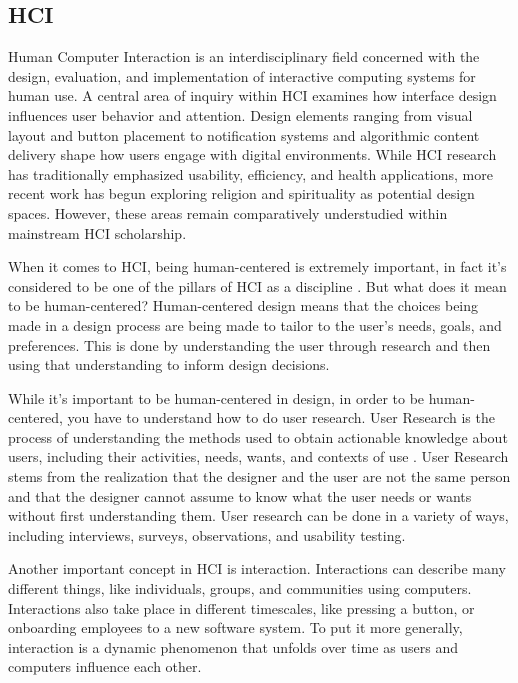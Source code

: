 \documentclass[12pt]{article}
\begin{document}
\subsection{HCI}
 Human Computer Interaction is an interdisciplinary field concerned with the design, evaluation, and implementation of interactive computing systems for human use. A central area of inquiry within HCI examines how interface design influences user behavior and attention\cite{10.1145/3538706}. Design elements ranging from visual layout and button placement to notification systems and algorithmic content delivery shape how users engage with digital environments. While HCI research has traditionally emphasized usability, efficiency, and health applications, more recent work has begun exploring religion and spirituality as potential design spaces. However, these areas remain comparatively understudied within mainstream HCI scholarship.

 When it comes to HCI, being human-centered is extremely important, in fact it's considered to be one of the pillars of HCI as a discipline \cite{Hornbæk_Kristensson_Oulasvirta_2025}. But what does it mean to be human-centered? Human-centered design means that the choices being made in a design process are being made to tailor to the user's needs, goals, and preferences. This is done by understanding the user through research and then using that understanding to inform design decisions. 

 While it's important to be human-centered in design, in order to be human-centered, you have to understand how to do user research. User Research is the process of understanding the methods used to obtain actionable knowledge about users, including their activities, needs, wants, and contexts of use \cite{Hornbæk_Kristensson_Oulasvirta_2025}.
 User Research stems from the realization that the designer and the user are not the same person and that the designer cannot assume to know what the user needs or wants without first understanding them. User research can be done in a variety of ways, including interviews, surveys, observations, and usability testing.
 
 Another important concept in HCI is interaction. Interactions can describe many different things, like individuals, groups, and communities using computers. Interactions also take place in different timescales, like pressing a button, or onboarding employees to a new software system. To put it more generally, interaction is a dynamic phenomenon that unfolds over time as users and computers influence each other. 
\end{document}
